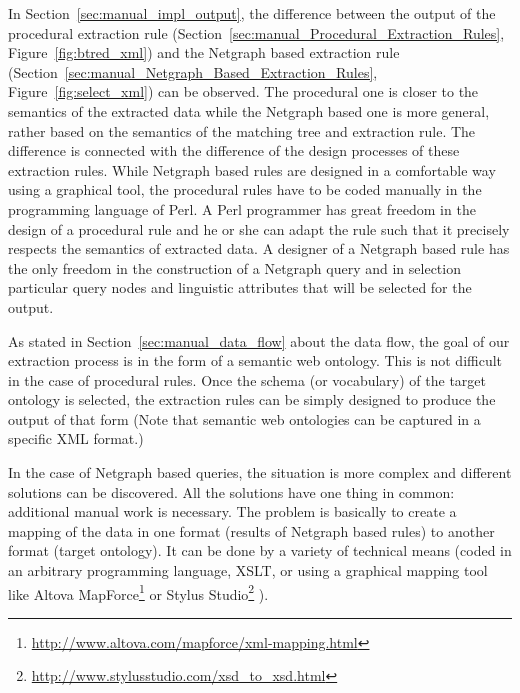In Section~\ref{sec:manual_impl_output}, the difference between the output of the procedural extraction rule (Section~\ref{sec:manual_Procedural_Extraction_Rules}, Figure~\ref{fig:btred_xml}) and the Netgraph based extraction rule (Section~\ref{sec:manual_Netgraph_Based_Extraction_Rules}, Figure~\ref{fig:select_xml}) can be observed. The procedural one is closer to the semantics of the extracted data while the Netgraph based one is more general, rather based on the semantics of the matching tree and extraction rule. The difference is connected with the difference of the design processes of these extraction rules. While Netgraph based rules are designed in a comfortable way using a graphical tool, the procedural rules have to be coded manually in the programming language of Perl. A Perl programmer has great freedom in the design of a procedural rule and he or she can adapt the rule such that it precisely respects the semantics of extracted data. A designer of a Netgraph based rule has the only freedom in the construction of a Netgraph query and in selection particular query nodes and linguistic attributes that will be selected for the output.

As stated in Section~\ref{sec:manual_data_flow} about the data flow, the goal of our extraction process is in the form of a semantic web ontology. This is not difficult in the case of procedural rules. Once the schema (or vocabulary) of the target ontology is selected, the extraction rules can be simply designed to produce the output of that form (Note that semantic web ontologies can be captured in a specific XML format.)

In the case of Netgraph based queries, the situation is more complex and different solutions can be discovered. All the solutions have one thing in common: additional manual work is necessary. The problem is basically to create a mapping of the data in one format (results of Netgraph based rules) to another format (target ontology). It can be done by a variety of technical means (coded in an arbitrary programming language, XSLT, or using a graphical mapping tool like 
Altova MapForce\footnote{\url{http://www.altova.com/mapforce/xml-mapping.html}}
or
Stylus Studio\footnote{\url{http://www.stylusstudio.com/xsd_to_xsd.html}}
). 



